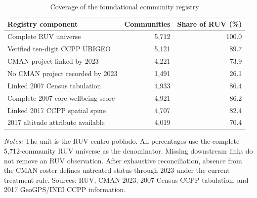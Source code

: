 \begin{table}[!htbp]
\centering
\caption{Coverage of the foundational community registry}
\label{tab:desc_sample_coverage}
\begin{tabular}{lrr}
\toprule
Registry component & Communities & Share of RUV (\%) \\
\midrule
Complete RUV universe & 5,712 & 100.0 \\
Verified ten-digit CCPP UBIGEO & 5,121 & 89.7 \\
CMAN project linked by 2023 & 4,221 & 73.9 \\
No CMAN project recorded by 2023 & 1,491 & 26.1 \\
Linked 2007 Census tabulation & 4,933 & 86.4 \\
Complete 2007 core wellbeing score & 4,921 & 86.2 \\
Linked 2017 CCPP spatial spine & 4,707 & 82.4 \\
2017 altitude attribute available & 4,019 & 70.4 \\
\bottomrule
\end{tabular}
\parbox{0.98\linewidth}{\footnotesize \textit{Notes:} The unit is the RUV centro poblado. All percentages use the complete 5,712-community RUV universe as the denominator. Missing downstream links do not remove an RUV observation. After exhaustive reconciliation, absence from the CMAN roster defines untreated status through 2023 under the current treatment rule. Sources: RUV, CMAN 2023, 2007 Census CCPP tabulation, and 2017 GeoGPS/INEI CCPP information.}
\end{table}
